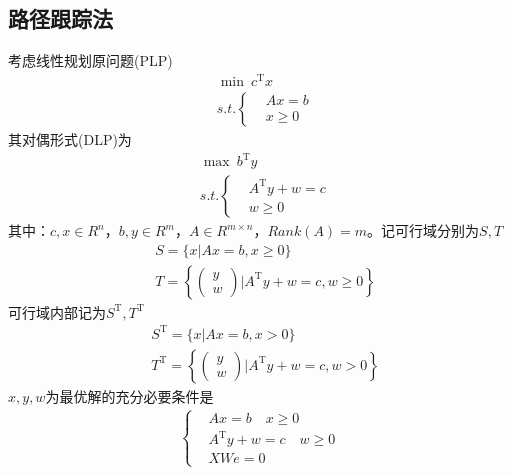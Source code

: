     \subsection{路径跟踪法}
        \par
        考虑线性规划原问题(PLP)
        \begin{align*}
        & \mathop{\min}\ c^\mathrm{T} x\\
        &s.t.\left\{
        \begin{aligned}
        &Ax = b\\
        &x \geqslant 0
        \end{aligned}
        \right.
        \end{align*}
        其对偶形式(DLP)为
        \begin{align*}
        &\mathop {\max}\  b^\mathrm{T} y\\
        &s.t.\left\{
        \begin{aligned}
        & A^\mathrm{T} y+w = c\\
        & w \geqslant 0
        \end{aligned}
        \right.
        \end{align*}
        其中：$c,x \in R^n$，$b,y \in R^m$，$A \in R^{m \times n}$，$Rank(A)= m$。记可行域分别为$S,T$
        \begin{align*}
        &S=\{x|Ax=b,x \geqslant 0\}\\
        &T=\left\{\begin{pmatrix}
        y\\w
        \end{pmatrix}\bigg|A^\mathrm{T} y+w=c,w \geqslant 0\right\}
        \end{align*}
        可行域内部记为$S^\mathrm{T} ,T^\mathrm{T} $
        \begin{align*}
        &S^\mathrm{T} =\{x|Ax=b,x>0\}\\
        &T^\mathrm{T} =\left\{\begin{pmatrix}
        y\\w
        \end{pmatrix}\bigg|A^\mathrm{T} y+w=c,w > 0\right\}
        \end{align*}
        $x,y,w$为最优解的充分必要条件是
        \begin{align*}
        \left\{
        \begin{aligned}
        & Ax = b \quad x \geqslant 0\\
        & A^\mathrm{T} y+w=c \quad w \geqslant 0\\
        & XWe = 0
        \end{aligned}
        \right.
        \end{align*}
